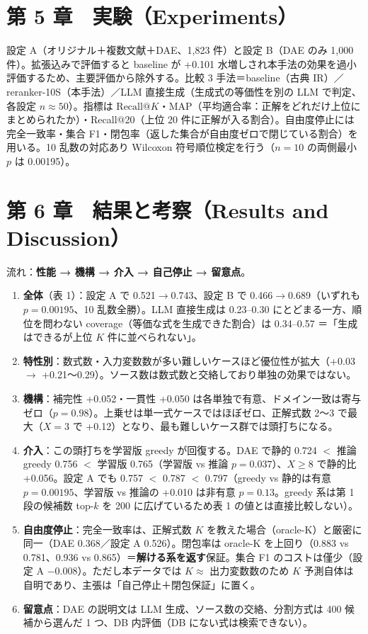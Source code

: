 \documentclass[11pt,a4paper]{ltjsarticle}
\makeatletter
\newcommand{\rk}{\textrm{Recall@}K}
\makeatother
\begin{document}
\section*{第 5 章　実験（Experiments）}
設定 A（オリジナル＋複数文献＋DAE、1{,}823 件）と設定 B（DAE のみ 1{,}000 件）。拡張込みで評価すると baseline が +0.101 水増しされ本手法の効果を過小評価するため、主要評価から除外する。比較 3 手法＝baseline（古典 IR）／reranker-10S（本手法）／LLM 直接生成（生成式の等価性を別の LLM で判定、各設定 $n\approx50$）。指標は $\rk$・MAP（平均適合率：正解をどれだけ上位にまとめられたか）・Recall@20（上位 20 件に正解が入る割合）。自由度停止には完全一致率・集合 F1・閉包率（返した集合が自由度ゼロで閉じている割合）を用いる。10 乱数の対応あり Wilcoxon 符号順位検定を行う（$n=10$ の両側最小 $p$ は 0.00195）。

\section*{第 6 章　結果と考察（Results and Discussion）}
流れ：\textbf{性能 → 機構 → 介入 → 自己停止 → 留意点}。
\begin{enumerate}
  \item \textbf{全体}（表 1）：設定 A で 0.521$\to$0.743、設定 B で 0.466$\to$0.689（いずれも $p=0.00195$、10 乱数全勝）。LLM 直接生成は 0.23--0.30 にとどまる一方、順位を問わない coverage（等価な式を生成できた割合）は 0.34--0.57 ＝「生成はできるが上位 $K$ 件に並べられない」。
  \item \textbf{特性別}：数式数・入力変数数が多い難しいケースほど優位性が拡大（+0.03 $\to$ +0.21〜0.29）。ソース数は数式数と交絡しており単独の効果ではない。
  \item \textbf{機構}：補完性 +0.052・一貫性 +0.050 は各単独で有意、ドメイン一致は寄与ゼロ（$p=0.98$）。上乗せは単一式ケースではほぼゼロ、正解式数 2〜3 で最大（$X=3$ で +0.12）となり、最も難しいケース群では頭打ちになる。
  \item \textbf{介入}：この頭打ちを学習版 greedy が回復する。DAE で静的 0.724 $<$ 推論 greedy 0.756 $<$ 学習版 0.765（学習版 vs 推論 $p=0.037$）、$X\ge8$ で静的比 +0.056。設定 A でも 0.757 $<$ 0.787 $<$ 0.797（greedy vs 静的は有意 $p=0.00195$、学習版 vs 推論の +0.010 は非有意 $p=0.13$。greedy 系は第 1 段の候補数 top-$k$ を 200 に広げているため表 1 の値とは直接比較しない）。
  \item \textbf{自由度停止}：完全一致率は、正解式数 $K$ を教えた場合（oracle-K）と厳密に同一（DAE 0.368／設定 A 0.526）。閉包率は oracle-K を上回り（0.883 vs 0.781、0.936 vs 0.865）＝\textbf{解ける系を返す}保証。集合 F1 のコストは僅少（設定 A $-0.008$）。ただし本データでは $K\approx$ 出力変数数のため $K$ 予測自体は自明であり、主張は「自己停止＋閉包保証」に置く。
  \item \textbf{留意点}：DAE の説明文は LLM 生成、ソース数の交絡、分割方式は 400 候補から選んだ 1 つ、DB 内評価（DB にない式は検索できない）。
\end{enumerate}
\end{document}
